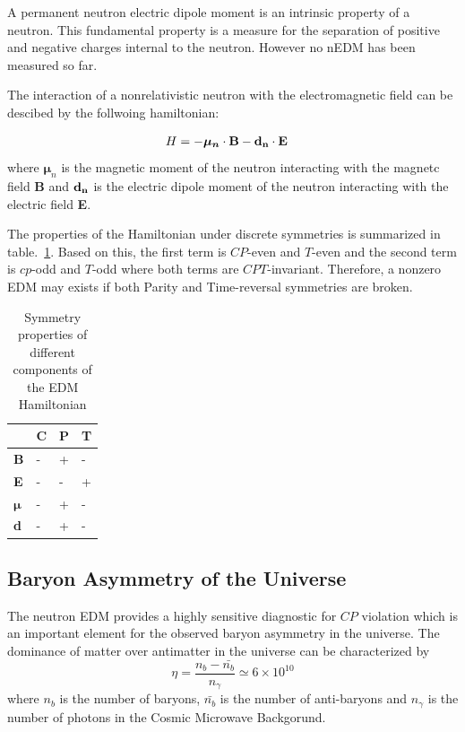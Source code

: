 A permanent neutron electric dipole moment is an intrinsic property of
a neutron. This fundamental property is a measure for the separation
of positive and negative charges internal to the neutron. However no
nEDM has been measured so far.

The interaction of a nonrelativistic neutron with
the electromagnetic field can be descibed by the follwoing
hamiltonian:

\begin{equation}
  \label{hamiltonian}
 \begin{split}
 H&= -\boldsymbol{\mu_n} \cdot \textbf{B} - \bf{d}_n \cdot \textbf{E}
 \end{split}
 \end{equation}
where $\boldsymbol{\mu}_n$ is the magnetic moment of the neutron
interacting with the magnetc field \textbf{B} and $\bf{d}_n$ is
the electric dipole moment of the neutron interacting with the
electric field \textbf{E}.

The properties of the Hamiltonian under discrete symmetries is
summarized in table.~\ref{Hsymmetry}. Based on this, the first term is
$CP$-even and $T$-even and the second term is $cp$-odd and $T$-odd
where both terms are $CPT$-invariant. Therefore, a nonzero EDM may
exists if both Parity and Time-reversal symmetries are broken.


\begin{table}
  \label{Hsymmetry}
\begin{center}
\begin{tabular}{| l | l | l | l |} 
\hline
 & C & P & T \\ \hline
\textbf{B} & - &+ &- \\ \hline
\textbf{E} & -&- &+ \\ \hline
$\boldsymbol{\mu}$ &- &+ &- \\ \hline 
\textbf{d} & -&+ &- \\ \hline
\end{tabular}
\caption{Symmetry properties of different components of the EDM Hamiltonian}
\end{center}
\end{table}
  


\subsection{Baryon Asymmetry of the Universe}
The neutron EDM provides a highly sensitive diagnostic for $CP$
violation which is an important element for the observed
baryon asymmetry in the universe.  The dominance of matter over
antimatter in the universe can be characterized by~\cite{Cline}
\begin{equation}
\eta = \frac{n_b-\bar{n_b}}{n_{\gamma}} \simeq 6 \times 10^{10}
\end{equation}
where $n_b$ is the number of baryons, $\bar{n_b}$ is the number of
anti-baryons and $n_{\gamma}$ is the number of photons in the Cosmic
Microwave Backgorund.

